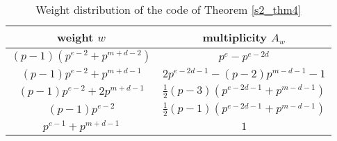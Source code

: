 \documentclass[final,1p,times]{elsarticle}
\begin{document}
  
   \begin{table}[h]
       \caption{Weight distribution of the code of  Theorem \ref{s2_thm4}}
              \label{tab_s2_thm4}
              \begin{center}
              \begin{tabular}{|c|c|}
              \hline
              weight $ w $ & multiplicity $ A_{w} $ \\
               \hline
              $ (p-1)(p^{e-2}+p^{m+d-2}) $ & $p^{e}-p^{e-2d} $\\
              \hline
              $ (p-1)p^{e-2}+p^{m+d-1} $ & $ 2p^{e-2d-1}-(p-2)p^{m-d-1}-1 $\\
              \hline
              $ (p-1)p^{e-2}+2p^{m+d-1} $ & $\frac{1}{2}(p-3)(p^{e-2d-1}+p^{m-d-1}) $\\
              \hline
              $ (p-1)p^{e-2} $ & $ \frac{1}{2}(p-1)(p^{e-2d-1}+p^{m-d-1}) $\\
              \hline
              $ p^{e-1}+p^{m+d-1} $ & $ 1 $\\
               \hline
              \end{tabular}
              \end{center}
        \end{table}
        
\end{document}

